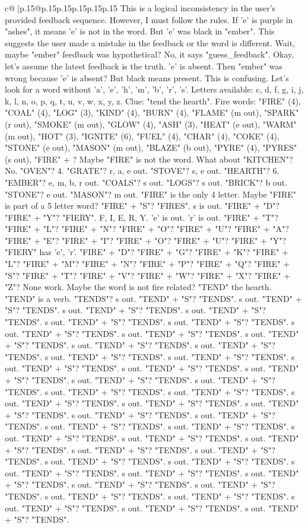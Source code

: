 \documentclass{article}
\begin{document}
{\begin{supertabular}{c@{$\;$}|p{.15\linewidth}@{}p{.15\linewidth}p{.15\linewidth}p{.15\linewidth}p{.15\linewidth}p{.15\linewidth}}
{{{This is a logical inconsistency in the user's provided feedback sequence. However, I must follow the rules. If 'e' is purple in "ashes", it means 'e' is not in the word. But 'e' was black in "ember". This suggests the user made a mistake in the feedback or the word is different. Wait, maybe "ember" feedback was hypothetical? No, it says "guess\_feedback". Okay, let's assume the latest feedback is the truth. 'e' is absent. Then "ember" was wrong because 'e' is absent? But black means present. This is confusing. Let's look for a word without 'a', 'e', 'h', 'm', 'b', 'r', 's'. Letters available: c, d, f, g, i, j, k, l, n, o, p, q, t, u, v, w, x, y, z. Clue: "tend the hearth". Fire words: "FIRE" (4), "COAL" (4), "LOG" (3), "KIND" (4), "BURN" (4), "FLAME" (m out), "SPARK" (r out), "SMOKE" (m out), "GLOW" (4), "ASH" (3), "HEAT" (e out), "WARM" (m out), "HOT" (3), "IGNITE" (6), "FUEL" (4), "CHAR" (4), "COKE" (4), "STONE" (e out), "MASON" (m out), "BLAZE" (b out), "PYRE" (4), "PYRES" (s out), "FIRE" + ? Maybe "FIRE" is not the word. What about "KITCHEN"? No. "OVEN"? 4. "GRATE"? r, a, e out. "STOVE"? s, e out. "HEARTH"? 6. "EMBER"? e, m, b, r out. "COALS"? s out. "LOGS"? s out. "BRICK"? b out. "STONE"? e out. "MASON"? m out. "FIRE" is the only 4 letter. Maybe "FIRE" is part of a 5 letter word? "FIRE" + "S"? "FIRES". s is out. "FIRE" + "D"? "FIRE" + "Y"? "FIERY". F, I, E, R, Y. 'e' is out. 'r' is out. "FIRE" + "T"? "FIRE" + "L"? "FIRE" + "N"? "FIRE" + "O"? "FIRE" + "U"? "FIRE" + "A"? "FIRE" + "E"? "FIRE" + "I"? "FIRE" + "O"? "FIRE" + "U"? "FIRE" + "Y"? "FIERY" has 'e', 'r'. "FIRE" + "D"? "FIRE" + "G"? "FIRE" + "K"? "FIRE" + "L"? "FIRE" + "M"? "FIRE" + "N"? "FIRE" + "P"? "FIRE" + "Q"? "FIRE" + "S"? "FIRE" + "T"? "FIRE" + "V"? "FIRE" + "W"? "FIRE" + "X"? "FIRE" + "Z"? None work. Maybe the word is not fire related? "TEND" the hearth. "TEND" is a verb. "TENDS"? s out. "TEND" + "S"? "TENDS". s out. "TEND" + "S"? "TENDS". s out. "TEND" + "S"? "TENDS". s out. "TEND" + "S"? "TENDS". s out. "TEND" + "S"? "TENDS". s out. "TEND" + "S"? "TENDS". s out. "TEND" + "S"? "TENDS". s out. "TEND" + "S"? "TENDS". s out. "TEND" + "S"? "TENDS". s out. "TEND" + "S"? "TENDS". s out. "TEND" + "S"? "TENDS". s out. "TEND" + "S"? "TENDS". s out. "TEND" + "S"? "TENDS". s out. "TEND" + "S"? "TENDS". s out. "TEND" + "S"? "TENDS". s out. "TEND" + "S"? "TENDS". s out. "TEND" + "S"? "TENDS". s out. "TEND" + "S"? "TENDS". s out. "TEND" + "S"? "TENDS". s out. "TEND" + "S"? "TENDS". s out. "TEND" + "S"? "TENDS". s out. "TEND" + "S"? "TENDS". s out. "TEND" + "S"? "TENDS". s out. "TEND" + "S"? "TENDS". s out. "TEND" + "S"? "TENDS". s out. "TEND" + "S"? "TENDS". s out. "TEND" + "S"? "TENDS". s out. "TEND" + "S"? "TENDS". s out. "TEND" + "S"? "TENDS". s out. "TEND" + "S"? "TENDS". s out. "TEND" + "S"? "TENDS". s out. "TEND" + "S"? "TENDS". s out. "TEND" + "S"? "TENDS". s out. "TEND" + "S"? "TENDS". s out. "TEND" + "S"? "TENDS". s out. "TEND" + "S"? "TENDS". s out. "TEND" + "S"? "TENDS". s out. "TEND" + "S"? "TENDS". s out. "TEND" + "S"? "TENDS". s out. "TEND" + "S"? "TENDS". s out. "TEND" + "S"? "TENDS". s out. "TEND" + "S"? "TENDS". s out. "TEND" + "S"? "TENDS". s out. "TEND" + "S"? "TENDS". }}}
\end{supertabular}}
\end{document}
